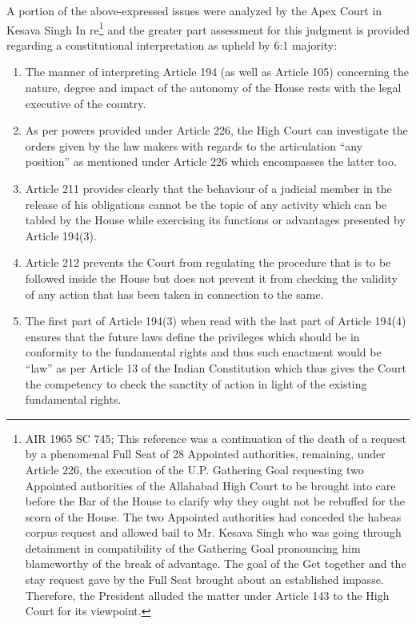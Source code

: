 \begin{multicols}{2}
\noi
A portion of the above-expressed issues were analyzed by the Apex Court in Kesava Singh In
re\footnote{AIR 1965 SC 745; This reference was a continuation of the death of a request by a phenomenal Full Seat of
28 Appointed authorities, remaining, under Article 226, the execution of the U.P. Gathering Goal requesting two
Appointed authorities of the Allahabad High Court to be brought into care before the Bar of the House to clarify
why they ought not be rebuffed for the scorn of the House. The two Appointed authorities had conceded the
habeas corpus request and allowed bail to Mr. Kesava Singh who was going through detainment in compatibility
of the Gathering Goal pronouncing him blameworthy of the break of advantage. The goal of the Get together
and the stay request gave by the Full Seat brought about an established impasse. Therefore, the President alluded
the matter under Article 143 to the High Court for its viewpoint.} and the greater part assessment for this judgment is provided regarding a constitutional interpretation as upheld by 6:1 majority:

\begin{enumerate}[label=$\bullet$]
\item The manner of interpreting Article 194 (as well as Article 105) concerning the nature,
degree and impact of the autonomy of the House rests with the legal executive of the
country.

\item As per powers provided under Article 226, the High Court can investigate the orders
given by the law makers with regards to the articulation “any position” as mentioned
under Article 226 which encompasses the latter too.

\item Article 211 provides clearly that the behaviour of a judicial member in the release of
his obligations cannot be the topic of any activity which can be tabled by the House
while exercising its functions or advantages presented by Article 194(3).

\item Article 212 prevents the Court from regulating the procedure that is to be followed
inside the House but does not prevent it from checking the validity of any action that
has been taken in connection to the same.

\item The first part of Article 194(3) when read with the last part of Article 194(4) ensures
that the future laws define the privileges which should be in conformity to the
fundamental rights and thus such enactment would be “law” as per Article 13 of the
Indian Constitution which thus gives the Court the competency to check the sanctity
of action in light of the existing fundamental rights.
\end{enumerate}


\end{multicols}

